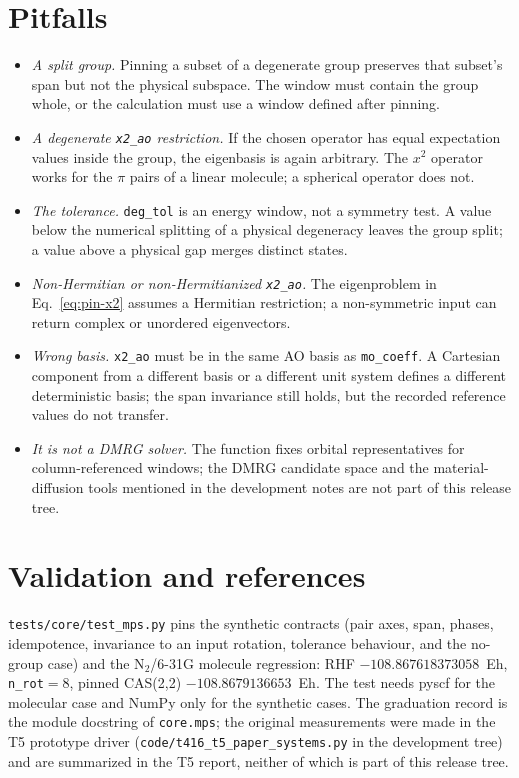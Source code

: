 \section{Pitfalls}
\label{sec:pin-pitfalls}

\begin{itemize}
\item \emph{A split group.}  Pinning a subset of a degenerate group
  preserves that subset's span but not the physical subspace.  The
  window must contain the group whole, or the calculation must use a
  window defined after pinning.
\item \emph{A degenerate \texttt{x2\_ao} restriction.}  If the chosen
  operator has equal expectation values inside the group, the
  eigenbasis is again arbitrary.  The $x^{2}$ operator works for the
  $\pi$ pairs of a linear molecule; a spherical operator does not.
\item \emph{The tolerance.}  \texttt{deg\_tol} is an energy window, not
  a symmetry test.  A value below the numerical splitting of a
  physical degeneracy leaves the group split; a value above a physical
  gap merges distinct states.
\item \emph{Non-Hermitian or non-Hermitianized \texttt{x2\_ao}.}  The
  eigenproblem in Eq.~\eqref{eq:pin-x2} assumes a Hermitian
  restriction; a non-symmetric input can return complex or unordered
  eigenvectors.
\item \emph{Wrong basis.}  \texttt{x2\_ao} must be in the same AO basis
  as \texttt{mo\_coeff}.  A Cartesian component from a different
  basis or a different unit system defines a different deterministic
  basis; the span invariance still holds, but the recorded reference
  values do not transfer.
\item \emph{It is not a DMRG solver.}  The function fixes orbital
  representatives for column-referenced windows; the DMRG candidate
  space and the material-diffusion tools mentioned in the development
  notes are not part of this release tree.
\end{itemize}

\section{Validation and references}
\label{sec:pin-validation}

\texttt{tests/core/test\_mps.py} pins the synthetic contracts (pair
axes, span, phases, idempotence, invariance to an input rotation,
tolerance behaviour, and the no-group case) and the N$_2$/6-31G
molecule regression: RHF $-108.867618373058$~Eh, \texttt{n\_rot}$=8$,
pinned CAS(2,2) $-108.8679136653$~Eh.  The test needs pyscf for the
molecular case and NumPy only for the synthetic cases.  The graduation
record is the module docstring of \texttt{core.mps}; the original
measurements were made in the T5 prototype driver
(\texttt{code/t416\_t5\_paper\_systems.py} in the development tree) and
are summarized in the T5 report, neither of which is part of this
release tree.

